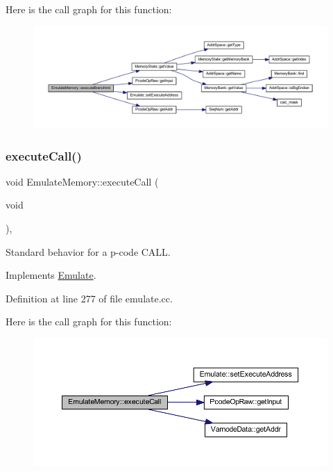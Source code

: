 Here is the call graph for this function\+:
\nopagebreak
\begin{figure}[H]
\begin{center}
\leavevmode
\includegraphics[width=350pt]{class_emulate_memory_a64cee14cda2a10ed440fe171b8fdbcc0_cgraph}
\end{center}
\end{figure}
\mbox{\label{class_emulate_memory_a20537bae3d7f06adeae32f99d1867b12}} 
\subsubsection{\texorpdfstring{executeCall()}{executeCall()}}
{\footnotesize\ttfamily void Emulate\+Memory\+::execute\+Call (\begin{DoxyParamCaption}\item[{void}]{ }\end{DoxyParamCaption})\hspace{0.3cm}{\ttfamily [protected]}, {\ttfamily [virtual]}}



Standard behavior for a p-\/code C\+A\+LL. 



Implements \mbox{\hyperlink{class_emulate_abdb4b20ec872310aba005d54813c35ce}{Emulate}}.



Definition at line 277 of file emulate.\+cc.

Here is the call graph for this function\+:
\nopagebreak
\begin{figure}[H]
\begin{center}
\leavevmode
\includegraphics[width=350pt]{class_emulate_memory_a20537bae3d7f06adeae32f99d1867b12_cgraph}
\end{center}
\end{figure}
\mbox{\label{class_emulate_memory_af1c25ebc29e2e57ab762d878ac8103e4}} 
